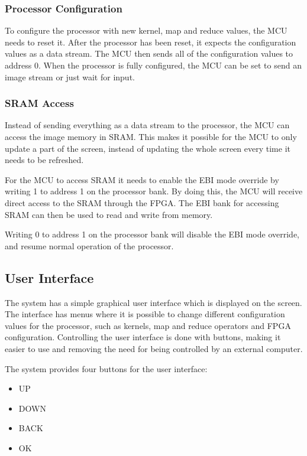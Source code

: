 \subsubsection{Processor Configuration}
To configure the processor with new kernel, map and reduce values, the MCU needs to reset it. After the processor has been reset, it expects the configuration values as a data stream. The MCU then sends all of the configuration values to address 0. When the processor is fully configured, the MCU can be set to send an image stream or just wait for input.


\subsubsection{SRAM Access}
Instead of sending everything as a data stream to the processor, the MCU can access the image memory in SRAM. This makes it possible for the MCU to only update a part of the screen, instead of updating the whole screen every time it needs to be refreshed.

For the MCU to access SRAM it needs to enable the EBI mode override by writing 1 to address 1 on the processor bank. By doing this, the MCU will receive direct access to the SRAM through the FPGA.
The EBI bank for accessing SRAM can then be used to read and write from memory.

Writing 0 to address 1 on the processor bank will disable the EBI mode override, and resume normal operation of the processor.


\subsection{User Interface}
The system has a simple graphical user interface which is displayed on the screen. The interface has menus where it is possible to change different configuration values for the processor, such as kernels, map and reduce operators and FPGA configuration. Controlling the user interface is done with buttons, making it easier to use and removing the need for being controlled by an external computer.

The system provides four buttons for the user interface:
\begin{itemize}
	\item UP
	\item DOWN
	\item BACK
	\item OK
\end{itemize}

